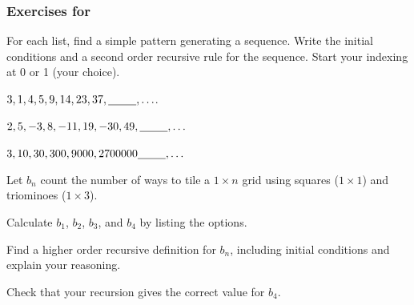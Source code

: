 
\subsubsection*{Exercises for  \submodelhigher}

\begin{exer}[\exerP] %
\label{exer_model_higher_order}
    For each list, find a simple pattern generating a sequence.  Write the initial conditions and a second order recursive rule for the sequence. Start your indexing at 0 or 1 (your choice).  
        \begin{exerpart}
            \item $3, 1, 4, 5, 9, 14, 23, 37,  \underline{\hspace{.3in}~}, \ldots$. %
            \item $2, 5, -3, 8, -11, 19, -30, 49,  \underline{\hspace{.3in}~}, \ldots$  %
            \item $3, 10, 30, 300, 9000, 2700000 \underline{\hspace{.3in}~}, \ldots$  %
        \end{exerpart}
\end{exer}

\begin{exer}[\exerU] %
\label{exer_squares_triominoes}
Let $b_n$ count the number of ways to tile a $1 \times n$ grid using squares ($1 \times 1$) and triominoes ($1 \times 3$).
    \begin{exerpart}
        \item Calculate $b_1$, $b_2$, $b_3$, and $b_4$ by listing the options.
        \item Find a higher order recursive definition for $b_n$, including initial conditions and explain your reasoning.
        \item Check that your recursion gives the correct value for $b_4$.
    \end{exerpart} 
\end{exer}

